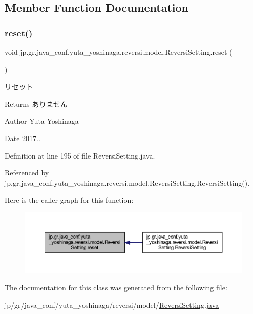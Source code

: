 \subsection{Member Function Documentation}
\mbox{\label{classjp_1_1gr_1_1java__conf_1_1yuta__yoshinaga_1_1reversi_1_1model_1_1_reversi_setting_afef8530666d1ce3522fd53938cd00353}} 
\subsubsection{\texorpdfstring{reset()}{reset()}}
{\footnotesize\ttfamily void jp.\+gr.\+java\+\_\+conf.\+yuta\+\_\+yoshinaga.\+reversi.\+model.\+Reversi\+Setting.\+reset (\begin{DoxyParamCaption}{ }\end{DoxyParamCaption})}



リセット 

\begin{DoxyReturn}{Returns}
ありません 
\end{DoxyReturn}
\begin{DoxyAuthor}{Author}
Yuta Yoshinaga 
\end{DoxyAuthor}
\begin{DoxyDate}{Date}
2017.. 
\end{DoxyDate}


Definition at line 195 of file Reversi\+Setting.\+java.



Referenced by jp.\+gr.\+java\+\_\+conf.\+yuta\+\_\+yoshinaga.\+reversi.\+model.\+Reversi\+Setting.\+Reversi\+Setting().

Here is the caller graph for this function\+:
\nopagebreak
\begin{figure}[H]
\begin{center}
\leavevmode
\includegraphics[width=350pt]{classjp_1_1gr_1_1java__conf_1_1yuta__yoshinaga_1_1reversi_1_1model_1_1_reversi_setting_afef8530666d1ce3522fd53938cd00353_icgraph}
\end{center}
\end{figure}


The documentation for this class was generated from the following file\+:\begin{DoxyCompactItemize}
\item 
jp/gr/java\+\_\+conf/yuta\+\_\+yoshinaga/reversi/model/\mbox{\hyperlink{_reversi_setting_8java}{Reversi\+Setting.\+java}}\end{DoxyCompactItemize}
